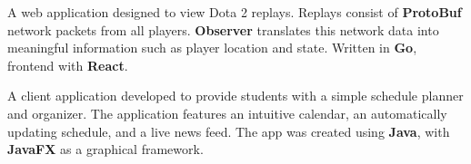 \documentclass[9pt,letter,normalphoto]{altacv}
\begin{document}
  \divider

  A web application designed to view Dota 2 replays. Replays consist of \textbf{ProtoBuf} network packets from all players. \textbf{Observer} translates this network data into meaningful information such as player location and state. Written in \textbf{Go}, frontend with \textbf{React}.
  
  \divider
  A client application developed to provide students with a simple schedule planner and organizer.
  The application features an intuitive calendar, an automatically updating schedule, and a live news feed.
  The app was created using \textbf{Java}, with \textbf{JavaFX} as a graphical framework.


\medskip
\end{document}
